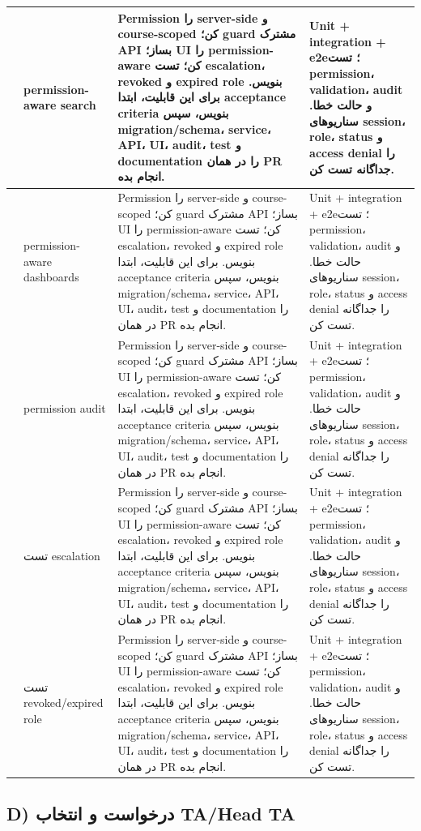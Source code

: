 \documentclass[11pt,a4paper]{article}
\begin{document}
\begin{longtable}{|>{\raggedleft\arraybackslash}p{}|>{\raggedleft\arraybackslash}p{}|>{\raggedleft\arraybackslash}p{}|>{\raggedleft\arraybackslash}p{}|}
46 & permission-aware search & Permission را server-side و course-scoped کن؛ guard مشترک API بساز؛ UI را permission-aware کن؛ تست escalation، revoked و expired role بنویس. برای این قابلیت، ابتدا acceptance criteria بنویس، سپس migration/schema، service، API، UI، audit، test و documentation را در همان PR انجام بده. & Unit + integration + e2e؛ تست permission، validation، audit و حالت خطا. سناریوهای session، role، status و access denial را جداگانه تست کن. \\ \hline
47 & permission-aware dashboards & Permission را server-side و course-scoped کن؛ guard مشترک API بساز؛ UI را permission-aware کن؛ تست escalation، revoked و expired role بنویس. برای این قابلیت، ابتدا acceptance criteria بنویس، سپس migration/schema، service، API، UI، audit، test و documentation را در همان PR انجام بده. & Unit + integration + e2e؛ تست permission، validation، audit و حالت خطا. سناریوهای session، role، status و access denial را جداگانه تست کن. \\ \hline
48 & permission audit & Permission را server-side و course-scoped کن؛ guard مشترک API بساز؛ UI را permission-aware کن؛ تست escalation، revoked و expired role بنویس. برای این قابلیت، ابتدا acceptance criteria بنویس، سپس migration/schema، service، API، UI، audit، test و documentation را در همان PR انجام بده. & Unit + integration + e2e؛ تست permission، validation، audit و حالت خطا. سناریوهای session، role، status و access denial را جداگانه تست کن. \\ \hline
49 & تست escalation & Permission را server-side و course-scoped کن؛ guard مشترک API بساز؛ UI را permission-aware کن؛ تست escalation، revoked و expired role بنویس. برای این قابلیت، ابتدا acceptance criteria بنویس، سپس migration/schema، service، API، UI، audit، test و documentation را در همان PR انجام بده. & Unit + integration + e2e؛ تست permission، validation، audit و حالت خطا. سناریوهای session، role، status و access denial را جداگانه تست کن. \\ \hline
50 & تست revoked/expired role & Permission را server-side و course-scoped کن؛ guard مشترک API بساز؛ UI را permission-aware کن؛ تست escalation، revoked و expired role بنویس. برای این قابلیت، ابتدا acceptance criteria بنویس، سپس migration/schema، service، API، UI، audit، test و documentation را در همان PR انجام بده. & Unit + integration + e2e؛ تست permission، validation، audit و حالت خطا. سناریوهای session، role، status و access denial را جداگانه تست کن. \\ \hline
\end{longtable}
\subsection{D) درخواست و انتخاب TA/Head TA}
\end{document}
